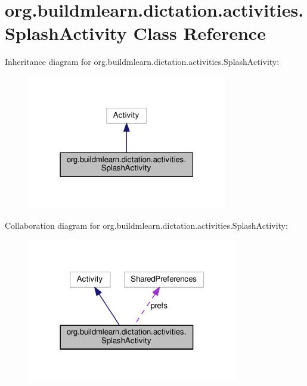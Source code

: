 \hypertarget{classorg_1_1buildmlearn_1_1dictation_1_1activities_1_1SplashActivity}{}\section{org.\+buildmlearn.\+dictation.\+activities.\+Splash\+Activity Class Reference}
\label{classorg_1_1buildmlearn_1_1dictation_1_1activities_1_1SplashActivity}


Inheritance diagram for org.\+buildmlearn.\+dictation.\+activities.\+Splash\+Activity\+:
\nopagebreak
\begin{figure}[H]
\begin{center}
\leavevmode
\includegraphics[width=247pt]{classorg_1_1buildmlearn_1_1dictation_1_1activities_1_1SplashActivity__inherit__graph}
\end{center}
\end{figure}


Collaboration diagram for org.\+buildmlearn.\+dictation.\+activities.\+Splash\+Activity\+:
\nopagebreak
\begin{figure}[H]
\begin{center}
\leavevmode
\includegraphics[width=261pt]{classorg_1_1buildmlearn_1_1dictation_1_1activities_1_1SplashActivity__coll__graph}
\end{center}
\end{figure}
